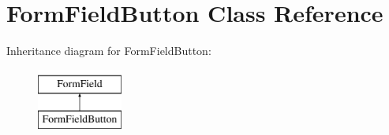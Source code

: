 \hypertarget{class_form_field_button}{}\section{Form\+Field\+Button Class Reference}
\label{class_form_field_button}
Inheritance diagram for Form\+Field\+Button\+:\begin{figure}[H]
\begin{center}
\leavevmode
\includegraphics[height=2.000000cm]{class_form_field_button}
\end{center}
\end{figure}
